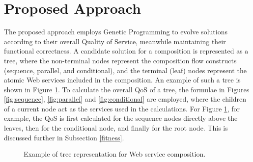\documentclass[conference]{IEEEtran}
\begin{document}
\section{Proposed Approach}\label{approach}
The proposed approach employs Genetic Programming to evolve solutions according to their overall Quality of Service, meanwhile maintaining their functional correctness. A candidate solution for a composition is represented as a tree, where the non-terminal nodes represent the composition flow constructs (sequence, parallel, and conditional), and the terminal (leaf) nodes represent the atomic Web services included in the composition. An example of such a tree is shown in Figure \ref{fig:tree}. To calculate the overall QoS of a tree, the formulae in Figures \ref{fig:sequence}, \ref{fig:parallel} and \ref{fig:conditional} are employed, where the children of a current node act as the services used in the calculations. For Figure \ref{fig:tree}, for example, the QoS is first calculated for the sequence nodes directly above the leaves, then for the conditional node, and finally for the root node. This is discussed further in Subsection \ref{fitness}.

\begin{figure}
\centerline{
}
\caption{Example of tree representation for Web service composition.}
\label{fig:tree}
\end{figure}
\end{document}
